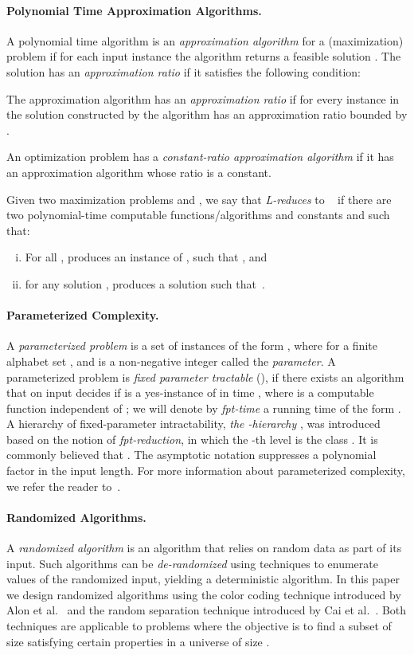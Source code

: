 \documentclass[11pt]{article}
\begin{document}
\paragraph{Polynomial Time Approximation Algorithms.} A polynomial time algorithm  is an {\it approximation algorithm} for a (maximization)
problem  if for each input instance  the algorithm 
returns a feasible solution .  The solution 
has an {\it approximation ratio } if it satisfies the following
condition:


The approximation algorithm  has an {\it approximation ratio } if
for every instance  in  the solution  constructed by the
algorithm  has an approximation ratio bounded by .

An optimization problem  has a {\em constant-ratio approximation algorithm} if it has an approximation algorithm whose ratio is a constant.

Given two maximization problems  and , we say that  {\em L-reduces} to ~\cite{py91} if there are two polynomial-time computable functions/algorithms  and constants  and  such that:

\begin{enumerate}[(i)]
  \item For all ,  produces an instance  of , such that , and
  \item for any solution ,  produces a solution  such that~.
\end{enumerate}

\paragraph{Parameterized Complexity.} A {\it parameterized problem} is a set of instances of the form , where  for a finite alphabet set , and
 is a non-negative integer called the {\em parameter}.
A parameterized problem  is {\it fixed parameter tractable} (), if there exists an algorithm that on input 
decides if  is a yes-instance of  in time ,
where  is a computable function independent of ; we will denote by {\em fpt-time} a running time of the form .
A hierarchy of fixed-parameter intractability, {\it the -hierarchy} , was introduced based on the notion of {\em fpt-reduction}, in which the -th level  is the class .  It is commonly believed that . The asymptotic notation  suppresses a polynomial factor in the input length. For more information about parameterized complexity, we refer the reader to~\cite{fptbook,grohebook,rolfbook}.

\paragraph{Randomized Algorithms.} A {\em randomized algorithm} is an algorithm that relies on random data as part of its input.  Such algorithms can be {\em de-randomized} using techniques to enumerate values of the randomized input, yielding a deterministic algorithm.  In this paper we design randomized algorithms using the color coding technique introduced by Alon et al.~\cite{alon95} and the random separation technique introduced by Cai et al.~\cite{cai}.  Both techniques are applicable to problems where the objective is to find a subset of size  satisfying certain properties in a universe of size .
\end{document}
